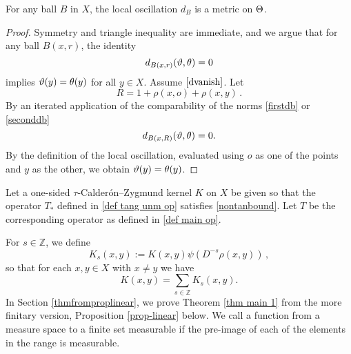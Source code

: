 \begin{lemma}
    For any ball $B$ in $X$, the local oscillation
$d_{B}$ is a metric on $\Theta$.
\end{lemma}

\begin{proof}
    Symmetry and triangle inequality are immediate, and we argue that
for any ball $B(x,r)$, the identity
\begin{equation}\label{dvanish}
d_{B(x,r)}(\vartheta,\theta)=0
\end{equation}
implies $\vartheta(y)=\theta(y)$ for all $y\in X$. Assume $\eqref{dvanish}$.
Let
\begin{equation}
    R=1+\rho(x,o)+\rho(x,y)\, .
\end{equation}
By an iterated application of
the comparability of the norms \eqref{firstdb} or \eqref{seconddb} 
\begin{equation}
    d_{B(x,R)}(\vartheta,\theta)=0.
\end{equation}
By the definition of
the local oscillation, evaluated using $o$ as one of the points and $y$ as the other, we obtain
$\vartheta(y)=\theta(y)$.
\end{proof}

Let a one-sided $\tau$-Calder\'on--Zygmund kernel $K$ on $X$ be given so that the operator $T_*$ defined in \eqref{def tang unm op}
satisfies
\eqref{nontanbound}. Let $T$ be the corresponding operator as defined in \eqref{def main op}.


For $s\in\mathbb{Z}$, we define
\begin{equation}\label{defks}
    K_s(x,y):=K(x,y)\psi(D^{-s}\rho(x,y))\,,
\end{equation}
so that for each $x, y \in X$ with $x\neq y$  we have
$$K(x,y)=\sum_{s\in\mathbb{Z}}K_s(x,y).$$
 In Section \ref{thmfromproplinear}, we prove Theorem \ref{thm main 1}
 from the more finitary version, Proposition \ref{prop-linear} below. We call a function from a measure space to a finite set measurable if the pre-image of each of the elements in the range is measurable.

